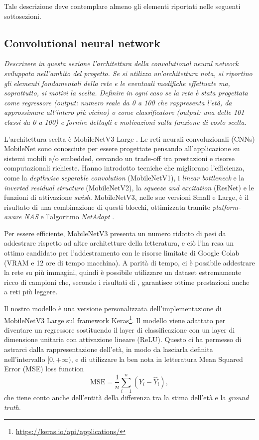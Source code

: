 Tale descrizione deve contemplare almeno gli elementi riportati nelle seguenti sottosezioni.

\subsection{Convolutional neural network}
\emph{Descrivere in questa sezione l’architettura della convolutional neural network
sviluppata nell’ambito del progetto. Se si utilizza un’architettura nota, si riportino gli elementi fondamentali della rete e le eventuali modifiche effettuate ma, soprattutto, si motivi la scelta.
Definire in ogni caso se la rete è stata progettata come regressore (output:
numero reale da 0 a 100 che rappresenta l’età, da approssimare all’intero più
vicino) o come classificatore (output: una delle 101 classi da 0 a 100) e fornire dettagli e motivazioni sulla funzione di costo scelta.}

L'architettura scelta è MobileNetV3 Large \cite{mobilenetv3}. Le reti neurali convoluzionali (CNNs) MobileNet sono conosciute per essere progettate pensando all'applicazione su sistemi mobili e/o embedded, cercando un trade-off tra prestazioni e risorse computazionali richieste. Hanno introdotto tecniche che migliorano l'efficienza, come la \emph{depthwise separable convolution} (MobileNetV1), i \emph{linear bottleneck} e la \emph{inverted residual structure} (MobileNetV2), la \emph{squeeze and excitation} (ResNet) e le funzioni di attivazione \emph{swish}. MobileNetV3, nelle sue versioni Small e Large, è il risultato di una combinazione di questi blocchi, ottimizzata tramite \emph{platform-aware NAS} e l'algoritmo \emph{NetAdapt} \cite{mobilenetv3}. 

Per essere efficiente, MobileNetV3 presenta un numero ridotto di pesi da addestrare rispetto ad altre architetture della letteratura, e ciò l'ha resa un ottimo candidato per l'addestramento con le risorse limitate di Google Colab (VRAM e 12 ore di tempo macchina). A parità di tempo, ci è possibile addestrare la rete su più immagini, quindi è possibile utilizzare un dataset estremamente ricco di campioni che, secondo i risultati di \cite{miviaage}, garantisce ottime prestazioni anche a reti più leggere.

Il nostro modello è una versione personalizzata dell'implementazione di MobileNetV3 Large sul framework Keras\footnote{\url{https://keras.io/api/applications/}}. Il modello viene adattato per diventare un regressore sostituendo il layer di classificazione con un layer di dimensione unitaria con attivazione lineare (ReLU). Questo ci ha permesso di astrarci dalla rappresentazione dell'età, in modo da lasciarla definita nell'intervallo \([0, +\infty)\), e di utilizzare la ben nota in letteratura Mean Squared Error (MSE) loss function
\begin{displaymath}
\text{MSE} = \frac{1}{n} \sum_{i=1}^{n} \left(Y_i - \hat{Y}_i\right),
\end{displaymath}
che tiene conto anche dell'entità della differenza tra la stima dell'età e la \emph{ground truth}.

